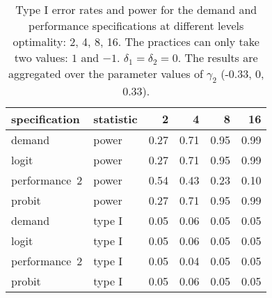 \begin{table}[ht]
\centering
\begingroup\footnotesize
\begin{tabular}{llrrrr}
  \hline
specification & statistic & 2 & 4 & 8 & 16 \\ 
  \hline
demand & power & 0.27 & 0.71 & 0.95 & 0.99 \\ 
  logit & power & 0.27 & 0.71 & 0.95 & 0.99 \\ 
  performance~2 & power & 0.54 & 0.43 & 0.23 & 0.10 \\ 
  probit & power & 0.27 & 0.71 & 0.95 & 0.99 \\ 
  demand & type I & 0.05 & 0.06 & 0.05 & 0.05 \\ 
  logit & type I & 0.05 & 0.06 & 0.05 & 0.05 \\ 
  performance~2 & type I & 0.05 & 0.04 & 0.05 & 0.05 \\ 
  probit & type I & 0.05 & 0.06 & 0.05 & 0.05 \\ 
   \hline
\end{tabular}
\endgroup
\caption{Type I error rates and power for the demand and 
  performance specifications at different levels optimality: 2, 
  4, 8, 16. The practices can only take two values: $1$ and $-1$.
  $\delta_1 = \delta_2 = 0$. The results are aggregated over 
  the parameter values of $\gamma_2$ (-0.33, 0, 0.33).} 
\label{discrete-table}
\end{table}
